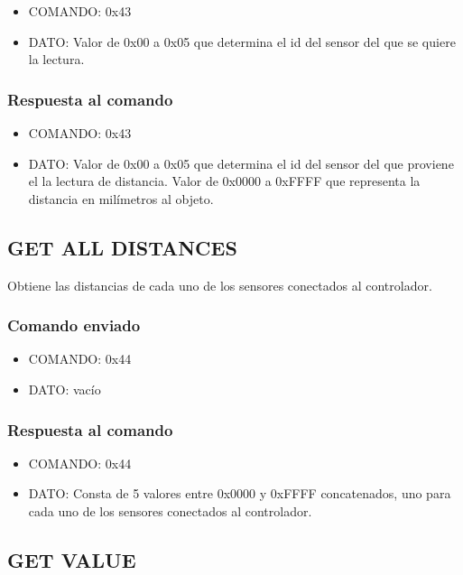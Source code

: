 \documentclass[a4paper,10pt]{article}
\begin{document}
\begin{itemize}
	\item{COMANDO:} 0x43
	\item{DATO:} Valor de 0x00 a 0x05 que determina el id del sensor del que se quiere la lectura.
\end{itemize}

\subsubsection*{Respuesta al comando}

\begin{itemize}
	\item{COMANDO:} 0x43
	\item{DATO:} Valor de 0x00 a 0x05 que determina el id del sensor del que proviene el la lectura de distancia.
	Valor de 0x0000 a 0xFFFF que representa la distancia en mil\'imetros al objeto.
\end{itemize}

\subsection{GET ALL DISTANCES}
\label{get_all_distances_us}

Obtiene las distancias de cada uno de los sensores conectados al controlador.

\subsubsection*{Comando enviado}

\begin{itemize}
	\item{COMANDO:} 0x44
	\item{DATO:} vac\'io
\end{itemize}

\subsubsection*{Respuesta al comando}

\begin{itemize}
	\item{COMANDO:} 0x44
	\item{DATO:} Consta de 5 valores entre 0x0000 y 0xFFFF concatenados, uno para cada uno de los sensores conectados al controlador.
\end{itemize}

\subsection{GET VALUE}
\label{get_value_us}
\end{document}
